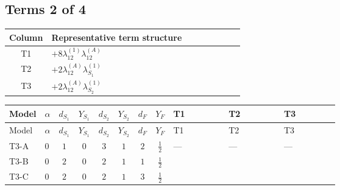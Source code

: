 \documentclass[8pt]{article}
\begin{document}
\begin{landscape}
\subsection*{Terms 2 of 4}
\begin{center}
\begin{tabular}{@{}c >{\raggedright\arraybackslash}p{0.82\linewidth}@{}}
\toprule
Column & Representative term structure \\
\midrule
T1 & \(\displaystyle +8 {\lambda_{12}^{(1)}} {\lambda_{12}^{(A)}}\) \\
\midrule
T2 & \(\displaystyle +2 {\lambda_{12}^{(A)}} {\lambda_{S_1}^{(1)}}\) \\
\midrule
T3 & \(\displaystyle +2 {\lambda_{12}^{(A)}} {\lambda_{S_2}^{(1)}}\) \\
\midrule
\bottomrule
\end{tabular}
\end{center}
\smallskip
\tiny
\begin{longtable}{@{}llcccccc >{\raggedright\arraybackslash}p{0.21\linewidth} >{\raggedright\arraybackslash}p{0.21\linewidth} >{\raggedright\arraybackslash}p{0.21\linewidth}@{}}
\toprule
Model & $\alpha$ & $d_{S_1}$ & $Y_{S_1}$ & $d_{S_2}$ & $Y_{S_2}$ & $d_F$ & $Y_F$ & T1 & T2 & T3 \\
\midrule
\endfirsthead
\toprule
Model & $\alpha$ & $d_{S_1}$ & $Y_{S_1}$ & $d_{S_2}$ & $Y_{S_2}$ & $d_F$ & $Y_F$ & T1 & T2 & T3 \\
\midrule
\endhead
T3-A & $0$ & $1$ & $0$ & $3$ & $1$ & $2$ & $\frac{1}{2}$ & --- & --- & --- \\
\midrule
T3-B & $0$ & $2$ & $0$ & $2$ & $1$ & $1$ & $\frac{1}{2}$ & \scriptsize\adjustbox{max width=\linewidth}{$\begin{gathered} +8 {\lambda_{12}^{(1)}} {\lambda_{12}^{(A)}}\end{gathered}$} & \scriptsize\adjustbox{max width=\linewidth}{$\begin{gathered} +2 {\lambda_{12}^{(A)}} {\lambda_{S_1}^{(1)}}\end{gathered}$} & \scriptsize\adjustbox{max width=\linewidth}{$\begin{gathered} +2 {\lambda_{12}^{(A)}} {\lambda_{S_2}^{(1)}}\end{gathered}$} \\
\midrule
T3-C & $0$ & $2$ & $0$ & $2$ & $1$ & $3$ & $\frac{1}{2}$ & \scriptsize\adjustbox{max width=\linewidth}{$\begin{gathered} +8 {\lambda_{12}^{(1)}} {\lambda_{12}^{(A)}}\end{gathered}$} & \scriptsize\adjustbox{max width=\linewidth}{$\begin{gathered} +2 {\lambda_{12}^{(A)}} {\lambda_{S_1}^{(1)}}\end{gathered}$} & \scriptsize\adjustbox{max width=\linewidth}{$\begin{gathered} +2 {\lambda_{12}^{(A)}} {\lambda_{S_2}^{(1)}}\end{gathered}$} \\

\end{longtable}
\end{landscape}
\end{document}
